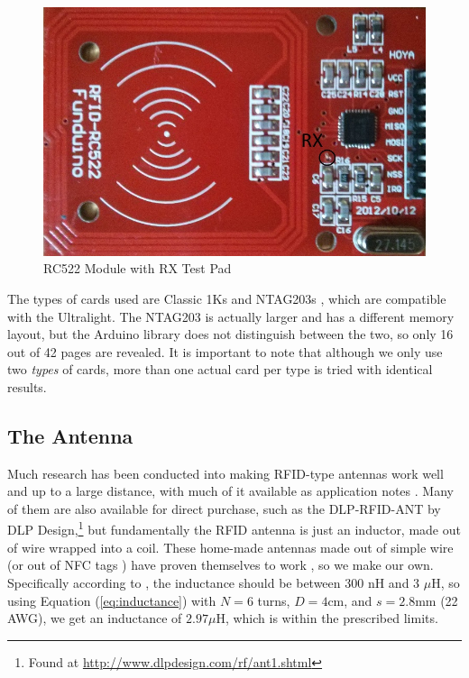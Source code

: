\documentclass[fleqn,10pt]{SelfArx} %
\begin{document}
\begin{figure}[tp]
  \includegraphics[width=\linewidth]{img/rc522}
  \caption{RC522 Module with RX Test Pad}
  \label{fig:rc522}
\end{figure}


The types of cards used are Classic 1Ks and NTAG203s \cite{ntag203}, which are compatible with the Ultralight. The NTAG203 is actually larger and has a different memory layout, but the Arduino library does not distinguish between the two, so only 16 out of 42 pages are revealed. It is important to note that although we only use two {\em types} of cards, more than one actual card per type is tried with identical results.

\subsection{The Antenna}
\label{subsec:antenna}

Much research has been conducted into making RFID-type antennas work well and up to a large distance, with much of it available as application notes \cite{mifare, antenna, pnantenna}. Many of them are also available for direct purchase, such as the DLP-RFID-ANT by DLP Design,\footnote{Found at \url{http://www.dlpdesign.com/rf/ant1.shtml}} but fundamentally the RFID antenna is just an inductor, made out of wire wrapped into a coil. These home-made antennas made out of simple wire (or out of NFC tags \cite{nfcantenna}) have proven themselves to work \cite{wireantenna}, so we make our own. Specifically according to \cite{pnantenna}, the inductance should be between 300 nH and 3 $\mu$H, so using Equation (\ref{eq:inductance}) with $N=6$ turns, $D=4$cm, and $s=2.8$mm (22 AWG), we get an inductance of $2.97 \mu$H, which is within the prescribed limits.
\end{document}
